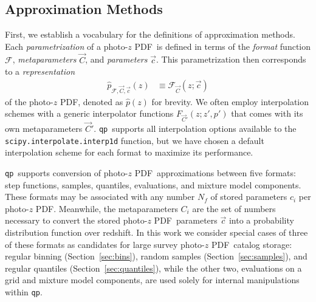 \documentclass[\docopts]{\docclass}
\newcommand{\qp}{\texttt{qp}\xspace}
\newcommand{\pz}{photo-$z$ PDF\xspace}
\begin{document}
\subsection{Approximation Methods}
\label{sec:approx}

First, we establish a vocabulary for the definitions of approximation methods.
Each \textit{parametrization} of a \pz\ is defined in terms of the
\textit{format} function $\mathcal{F}$, \textit{metaparameters}
$\vec{C}$, and \textit{parameters} $\vec{c}$.  This parametrization
then corresponds to a \textit{representation}
\begin{align}
  \label{eq:definition}
  \hat{p}_{\mathcal{F}, \vec{C}, \vec{c}}(z) &\equiv \mathcal{F}_{\vec{C}}(z;
\vec{c})
\end{align}
of the \pz, denoted as $\hat{p}(z)$ for brevity.  We often employ interpolation
schemes with a generic interpolator functions $F_{\vec{C}'}(z; z', p')$ that
comes with its own metaparameters $\vec{C}'$.
\qp\ supports all interpolation options
available to the \texttt{scipy.interpolate.interp1d} function,  but we
have chosen a default interpolation scheme for each format to maximize its
performance.

\qp\ supports conversion of \pz\ approximations between five formats: step functions,
samples, quantiles, evaluations, and mixture model components.  These formats
may be associated with any number $N_{f}$ of stored parameters $c_{i}$ per \pz.
Meanwhile, the metaparameters $C_{i}$ are the set of numbers necessary to convert the stored
\pz\ parameters $\vec{c}$ into a probability distribution function over
redshift.  In this work we consider special cases of three of these formats as candidates
for large survey \pz\ catalog storage: regular binning (Section~\ref{sec:bins}),
random samples (Section~\ref{sec:samples}), and regular quantiles (Section~\ref{sec:quantiles}), while the other two, evaluations on a grid and mixture
model components, are used solely for internal manipulations within \qp.
\end{document}
